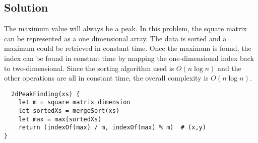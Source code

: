 \subsection*{Solution}
The maximum value will always be a peak. In this problem, the square matrix can be represented as a one dimensional array. The data is sorted and a maximum could be retrieved in constant time. Once the maximum is found, the index can be found in constant time by mapping the one-dimensional index back to two-dimensional. Since the sorting algorithm used is $O(n \log n)$ and the other operations are all in constant time, the overall complexity is $O(n \log n)$.

\begin{verbatim}
  2dPeakFinding(xs) {
    let m = square matrix dimension
    let sortedXs = mergeSort(xs)
    let max = max(sortedXs)
    return (indexOf(max) / m, indexOf(max) % m)  # (x,y)
}
\end{verbatim}
